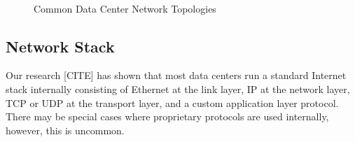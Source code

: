 \captionsetup[subfloat]{captionskip=-0.003in}
\begin{figure}
    \centering
    \\
    \vspace{-0.1in}
    \vspace{-0.07in}
    \caption{Common Data Center Network Topologies}
    \label{fig:common_topos}
\end{figure}


\subsection {Network Stack}

Our research [CITE] has shown that most data centers run a standard Internet stack internally consisting of Ethernet at the link layer, IP at the network layer, TCP or UDP at the transport layer, and a custom application layer protocol.  There may be special cases where proprietary protocols are used internally, however, this is uncommon.
